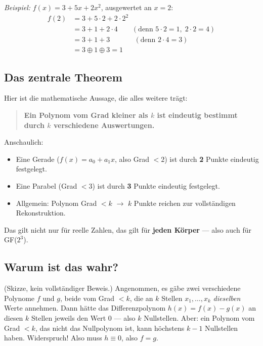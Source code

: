 \textit{Beispiel:} $f(x) = 3 + 5x + 2x^2$, ausgewertet an $x = 2$:
\begin{align*}
  f(2) &= 3 + 5 \cdot 2 + 2 \cdot 2^2 \\
       &= 3 + 1 + 2 \cdot 4 \quad\quad (\text{denn } 5 \cdot 2 = 1, \; 2 \cdot 2 = 4) \\
       &= 3 + 1 + 3 \quad\quad\quad\;\, (\text{denn } 2 \cdot 4 = 3) \\
       &= 3 \oplus 1 \oplus 3 = 1
\end{align*}

\subsection*{Das zentrale Theorem}

Hier ist die mathematische Aussage, die alles weitere trägt:

\begin{quote}
\textbf{Ein Polynom vom Grad kleiner als $k$ ist eindeutig bestimmt
durch $k$ verschiedene Auswertungen.}
\end{quote}

Anschaulich:
\begin{itemize}
\item Eine Gerade ($f(x) = a_0 + a_1 x$, also Grad $< 2$) ist durch
  \textbf{2} Punkte eindeutig festgelegt.
\item Eine Parabel (Grad $< 3$) ist durch \textbf{3} Punkte eindeutig
  festgelegt.
\item Allgemein: Polynom Grad $< k$ $\to$ $k$ Punkte reichen zur
  vollständigen Rekonstruktion.
\end{itemize}

Das gilt nicht nur für reelle Zahlen, das gilt für \textbf{jeden
Körper} — also auch für GF($2^3$).

\subsection*{Warum ist das wahr?}

(Skizze, kein vollständiger Beweis.) Angenommen, es gäbe zwei
verschiedene Polynome $f$ und $g$, beide vom Grad $< k$, die an $k$
Stellen $x_1, \dots, x_k$ \emph{dieselben} Werte annehmen. Dann hätte
das Differenzpolynom $h(x) = f(x) - g(x)$ an diesen $k$ Stellen
jeweils den Wert $0$ — also $k$ Nullstellen. Aber: ein Polynom vom
Grad $< k$, das nicht das Nullpolynom ist, kann höchstens $k - 1$
Nullstellen haben. Widerspruch! Also muss $h \equiv 0$, also $f = g$.

